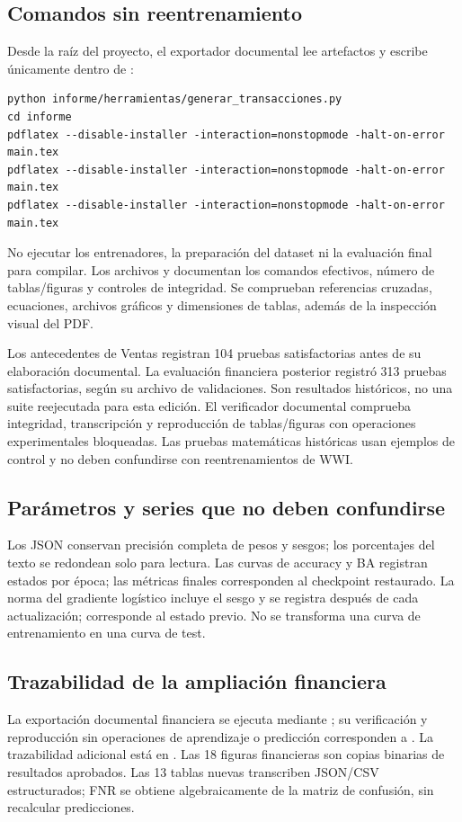 \subsection{Comandos sin reentrenamiento}
Desde la raíz del proyecto, el exportador documental lee artefactos y escribe únicamente dentro de :
\begin{verbatim}
python informe/herramientas/generar_transacciones.py
cd informe
pdflatex --disable-installer -interaction=nonstopmode -halt-on-error main.tex
pdflatex --disable-installer -interaction=nonstopmode -halt-on-error main.tex
pdflatex --disable-installer -interaction=nonstopmode -halt-on-error main.tex
\end{verbatim}
No ejecutar los entrenadores, la preparación del dataset ni la evaluación final para compilar. Los archivos  y  documentan los comandos efectivos, número de tablas/figuras y controles de integridad. Se comprueban referencias cruzadas, ecuaciones, archivos gráficos y dimensiones de tablas, además de la inspección visual del PDF.

Los antecedentes de Ventas registran 104 pruebas satisfactorias antes de su elaboración documental. La evaluación financiera posterior registró 313 pruebas satisfactorias, según su archivo de validaciones. Son resultados históricos, no una suite reejecutada para esta edición. El verificador documental comprueba integridad, transcripción y reproducción de tablas/figuras con operaciones experimentales bloqueadas. Las pruebas matemáticas históricas usan ejemplos de control y no deben confundirse con reentrenamientos de WWI.

\subsection{Parámetros y series que no deben confundirse}
Los JSON conservan precisión completa de pesos y sesgos; los porcentajes del texto se redondean solo para lectura. Las curvas de accuracy y BA registran estados por época; las métricas finales corresponden al checkpoint restaurado. La norma del gradiente logístico incluye el sesgo y se registra después de cada actualización;  corresponde al estado previo. No se transforma una curva de entrenamiento en una curva de test.

\subsection{Trazabilidad de la ampliación financiera}
La exportación documental financiera se ejecuta mediante ; su verificación y reproducción sin operaciones de aprendizaje o predicción corresponden a . La trazabilidad adicional está en . Las 18 figuras financieras son copias binarias de resultados aprobados. Las 13 tablas nuevas transcriben JSON/CSV estructurados; FNR se obtiene algebraicamente de la matriz de confusión, sin recalcular predicciones.

